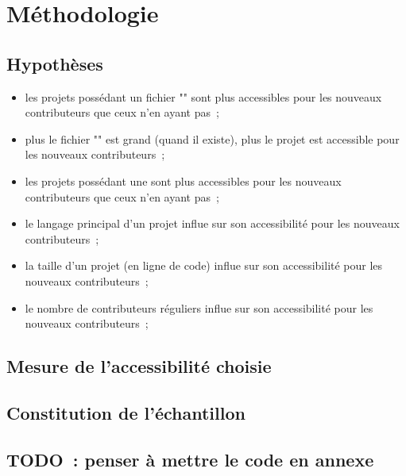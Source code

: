 \chapter{Méthodologie}

\section{Hypothèses}


\begin{itemize}
    \item les projets possédant un fichier "" sont plus accessibles pour les nouveaux contributeurs
        que ceux n'en ayant pas ;
    \item plus le fichier "" est grand (quand il existe), plus le projet est accessible pour les
        nouveaux contributeurs ;
    \item les projets possédant une  sont plus accessibles pour les nouveaux contributeurs que
        ceux n'en ayant pas ;
    \item le langage principal d'un projet influe sur son accessibilité pour les nouveaux contributeurs ;
    \item la taille d'un projet (en ligne de code) influe sur son accessibilité pour les nouveaux
        contributeurs ;
    \item le nombre de contributeurs réguliers influe sur son accessibilité pour les nouveaux contributeurs ;
\end{itemize}

\section{Mesure de l'accessibilité choisie}



\section{Constitution de l'échantillon}


\section*{TODO : penser à mettre le code en annexe}
